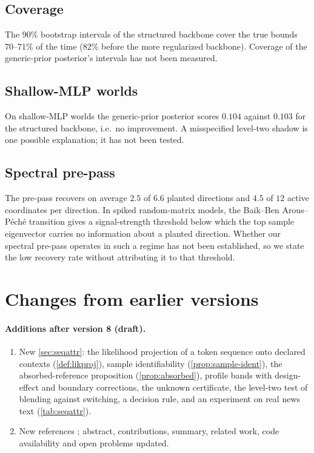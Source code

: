 \documentclass[11pt]{article}
\theoremstyle{definition}
\theoremstyle{remark}
\begin{document}
\subsection{Coverage}
The 90\% bootstrap intervals of the structured backbone cover the true bounds 70--71\% of the time
(82\% before the more regularized backbone). Coverage of the generic-prior posterior's intervals has
not been measured.

\subsection{Shallow-MLP worlds}
On shallow-MLP worlds the generic-prior posterior scores $0.104$ against $0.103$ for the structured
backbone, i.e.\ no improvement. A misspecified level-two shadow is one possible explanation; it has not been
tested.

\subsection{Spectral pre-pass}
The pre-pass recovers on average $2.5$ of $6.6$ planted directions and $4.5$ of $12$ active
coordinates per direction. In spiked random-matrix models, the Baik--Ben Arous--P\'ech\'e transition
\cite{BBP2005} gives a signal-strength threshold below which the top sample eigenvector carries no
information about a planted direction. Whether our spectral pre-pass operates in such a regime has
not been established, so we state the low recovery rate without attributing it to that threshold.

\section{Changes from earlier versions}\label{app:changes}

\paragraph{Additions after version 8 (draft).}
\begin{enumerate}[leftmargin=*,label=(\alph*)]
\item New \cref{sec:seqattr}: the likelihood projection of a token sequence onto declared contexts (\cref{def:likproj}), sample identifiability (\cref{prop:sample-ident}), the absorbed-reference proposition (\cref{prop:absorbed}), profile bands with design-effect and boundary corrections, the unknown certificate, the level-two test of blending against switching, a decision rule, and an experiment on real news text (\cref{tab:seqattr}).
\item New references \cite{BABE2021,BASIL2019,Chernoff1954,CohenWang2024,CsiszarTusnady1984,Davies1977,DempsterLairdRubin1977,SelfLiang1987,Shi2024,White1982}; abstract, contributions, summary, related work, code availability and open problems updated.
\end{enumerate}
\end{document}
